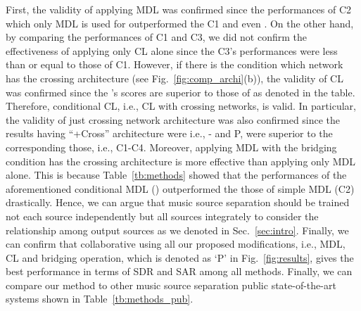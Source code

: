 \documentclass{article}
\begin{document}
First, the validity of applying MDL was confirmed since the performances of C2 which only MDL is used for outperformed the C1 and even .
On the other hand, by comparing the performances of C1 and C3, we did not confirm the effectiveness of applying only CL alone since the C3's performances were less than or equal to those of C1.
However, if there is the condition which network has the crossing architecture (see Fig.~\ref{fig:comp_archi}(b)), the validity of CL was confirmed since the 's scores are superior to those of  as denoted in the table.
Therefore, conditional CL, i.e., CL with crossing networks, is valid.
In particular, the validity of just crossing network architecture was also confirmed since the results having ``+Cross'' architecture were i.e., - and P, were superior to the corresponding those, i.e., C1-C4.
Moreover, applying MDL with the bridging condition has the crossing architecture is more effective than applying only MDL alone.
This is because Table~\ref{tb:methods} showed that the performances of the aforementioned conditional MDL () outperformed the those of simple MDL (C2) drastically.
Hence, we can argue that music source separation should be trained not each source independently but all sources integrately to consider the relationship among output sources as we denoted in Sec.~\ref{sec:intro}.
\fi
Finally, we can confirm that collaborative using all our proposed modifications, i.e., MDL, CL and bridging operation, which is denoted as `P' in Fig.~\ref{fig:results}, gives the best performance in terms of SDR and SAR among all methods.
Finally, we can compare our method to other music source separation public state-of-the-art systems shown in Table~\ref{tb:methods_pub}.
\\
\end{document}
